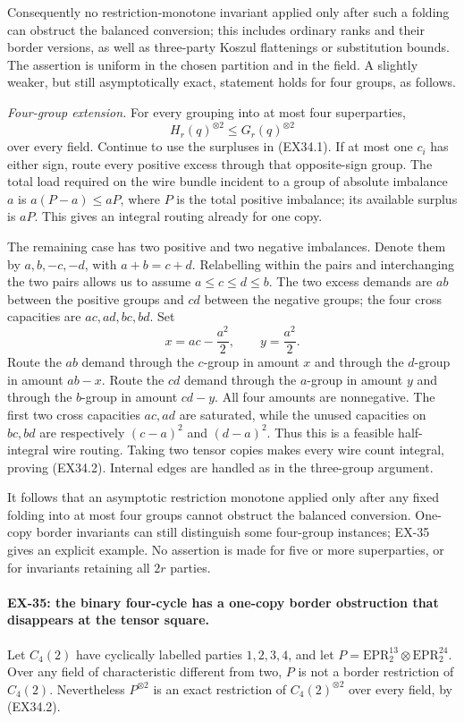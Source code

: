 Consequently no restriction-monotone invariant applied only
after such a folding can obstruct the balanced conversion;
this includes ordinary ranks and their border versions, as
well as three-party Koszul flattenings or substitution bounds.
The assertion is uniform in the chosen partition and in the
field. A slightly weaker, but still asymptotically exact,
statement holds for four groups, as follows.

\emph{Four-group extension.}
For every grouping into at most four superparties,
\[
 H_r(q)^{\otimes2}\le G_r(q)^{\otimes2}
 \tag{EX34.2}
\]
over every field. Continue to use the surpluses in
(EX34.1). If at most one $c_i$ has either sign, route every
positive excess through that opposite-sign group. The total
load required on the wire bundle incident to a group of
absolute imbalance $a$ is $a(P-a)\le aP$, where $P$
is the total positive imbalance; its available surplus is
$aP$. This gives an integral routing already for one copy.

The remaining case has two positive and two negative
imbalances. Denote them by $a,b,-c,-d$, with
$a+b=c+d$. Relabelling within the pairs and interchanging
the two pairs allows us to assume
$a\le c\le d\le b$. The two excess demands are $ab$
between the positive groups and $cd$ between the negative
groups; the four cross capacities are $ac,ad,bc,bd$.
Set
\[
 x=ac-\frac{a^2}{2},\qquad y=\frac{a^2}{2}.
\]
Route the $ab$ demand through the $c$-group in amount $x$
and through the $d$-group in amount $ab-x$. Route the $cd$
demand through the $a$-group in amount $y$ and through the
$b$-group in amount $cd-y$. All four amounts are
nonnegative. The first two cross capacities $ac,ad$ are
saturated, while the unused capacities on $bc,bd$ are
respectively $(c-a)^2$ and $(d-a)^2$. Thus this is a feasible
half-integral wire routing. Taking two tensor copies makes
every wire count integral, proving (EX34.2). Internal edges
are handled as in the three-group argument.

It follows that an asymptotic restriction monotone applied
only after any fixed folding into at most four groups cannot
obstruct the balanced conversion. One-copy border invariants
can still distinguish some four-group instances; EX-35 gives
an explicit example. No assertion is made for five or more
superparties, or for invariants retaining all $2r$ parties.

\paragraph{EX-35: the binary four-cycle has a one-copy border obstruction that disappears at the tensor square.}
Let $C_4(2)$ have cyclically labelled parties $1,2,3,4$, and
let $P=\mathrm{EPR}_2^{13}\otimes\mathrm{EPR}_2^{24}$.
Over any field of characteristic different from two,
$P$ is not a border restriction of $C_4(2)$. Nevertheless
$P^{\otimes2}$ is an exact restriction of
$C_4(2)^{\otimes2}$ over every field, by (EX34.2).

